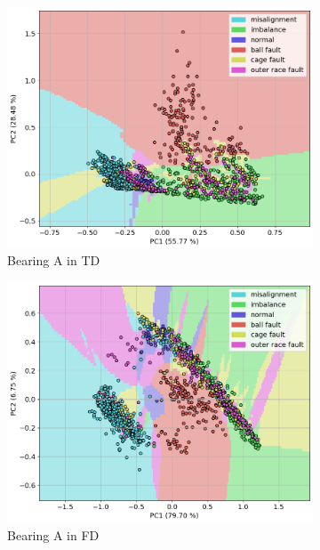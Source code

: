 \documentclass{llncs}
\begin{document}
\begin{figure}
	\centering
     \begin{subfigure}[b]{0.24\textwidth}
         \centering
         \includegraphics[width=\textwidth]{fig/scatter-mafaulda/td-a-bearing.png}
         \caption{Bearing A in TD}
     \end{subfigure}
     \hfill
     \begin{subfigure}[b]{0.24\textwidth}
         \centering
         \includegraphics[width=\textwidth]{fig/scatter-mafaulda/fd-a-bearing.png}
         \caption{Bearing A in FD}
     \end{subfigure}
     \hfill
     \begin{subfigure}[b]{0.24\textwidth}

\end{subfigure}
\end{figure}
\end{document}
